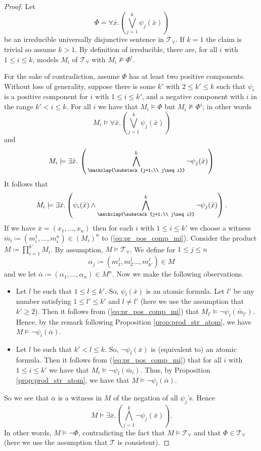 \begin{proof}
	Let 
	\[
	\Phi = \forall \bar{x}. \left(\bigvee_{j=1}^k \psi_j(\bar{x})\right) 
	\]
	be an irreducible universally disjunctive sentence in $\mathcal{T}_{\forall}$. If $k= 1$ the claim is trivial so assume $k>1$. By definition of irreducible, there are, for all $i$ with $1\leq i \leq k$, models $M_i$ of $\mathcal{T}_{\forall}$ with $M_i \nvDash \Phi^i$.
	
	For the sake of contradiction, assume $\Phi$ has at least two positive components. Without loss of generality, suppose there is some $k'$ with $2\leq k' \leq k$ such that $\psi_i$ is a positive component for $i$ with $1\leq i\leq k'$, and a negative component with $i$ in the range $k'< i \leq k$. For all $i$ we have that $M_i\models \Phi$ but $M_i\nvDash \Phi^i$; in other words
	\[
	M_i \models \forall \bar{x}. \left(\bigvee_{j=1}^k \psi_j(\bar{x})\right) 
	\]
	and
	\[
	M_i \models \exists \bar{x}.\, \left(\,\bigwedge_{\mathclap{\substack{j=1;\\
				j\neq i}}}^k \neg\psi_j(\bar{x})\right) 
	\]
	It follows that 
	\begin{equation}\label{eq:pr_pos_comp_mi}
		M_i \models \exists \bar{x}.\left(\psi_i(\bar{x}) \wedge  \bigwedge_{\mathclap{\substack{j=1;\\
					j\neq i}}}^k \neg\psi_j(\bar{x})\right).
	\end{equation}
	If we have $\bar{x} = (x_1,\ldots,x_n)$ then for each $i$ with $1\leq i \leq k'$ we choose a witness $\bar{m}_i \coloneqq (m^1_i,\ldots,m^n_i)\in (M_i)^n$ to (\ref{eq:pr_pos_comp_mi}). Consider the product $M\coloneqq \prod_{i=1}^{k'} M_i$. By assumption, $M\models \mathcal{T}_{\forall}$. We define for $1\leq j \leq n$
	\[
	\alpha_j \coloneqq (m^j_1,m^j_2\ldots,m^j_{k'}) \in M
	\]
	and we let $\bar{\alpha}\coloneqq (\alpha_1,\ldots,\alpha_n)\in M^n$.
	Now we make the following observations.
	\begin{itemize}
		\item Let $l$ be such that $1\leq l \leq k'$. So, $\psi_l(\bar{x})$ is an atomic formula. Let $l'$ be any number satisfying $1\leq l'\leq k'$ and $l\neq l'$ (here we use the assumption that $k'\geq 2$). Then it follows from (\ref{eq:pr_pos_comp_mi}) that $M_{l'} \models \neg\psi_{l}(\bar{m}_{l'})$. Hence, by the remark following Proposition \ref{prop:prod_str_atom}, we have $M \models \neg \psi_l(\bar{\alpha})$.
		\item Let $l$ be such that $k'< l\leq k$. So, $\neg\psi_l(\bar{x})$ is (equivalent to) an atomic formula. Then it follows from (\ref{eq:pr_pos_comp_mi}) that for all $i$ with $1\leq i\leq k'$ we have that $M_i\models \neg\psi_{l}(\bar{m}_{i})$. Thus, by Proposition \ref{prop:prod_str_atom}, we have that $M \models \neg \psi_l(\bar{\alpha})$.
	\end{itemize}
	So we see that $\bar{\alpha}$ is a witness in $M$ of the negation of all $\psi_j$'s. Hence
	\[
	M \models \exists \bar{x}. \left(\bigwedge_{j=1}^k \neg\psi_j(\bar{x})\right).
	\]
	In other words, $M \models \neg \Phi$, contradicting the fact that $M\models \mathcal{T}_{\forall}$ and that $\Phi\in \mathcal{T}_{\forall}$ (here we use the assumption that $\mathcal{T}$ is consistent).
\end{proof}
